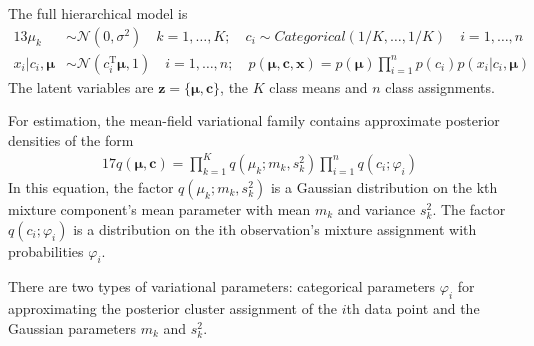 \documentclass[letterpaper]{article}
\newcommand{\bz}{\mathbf{z}}
\newcommand{\bx}{\mathbf{x}}
\newcommand{\bmu}{\boldsymbol{\mu}}
\newcommand{\calN}{\mathcal{N}}
\newcommand{\bT}{\mathrm{T}}
\newcommand{\bc}{\mathbf{c}}
\begin{document}
The full hierarchical model is
\begin{alignat}{13}
\mu_k &\sim \calN(0, \sigma^2) \quad k=1,\dots,K; \quad c_i \sim Categorical(1/K, \dots, 1/K) \quad i=1,\dots,n \\
x_i | c_i, \bmu &\sim \calN(c^{\bT}_i \bmu, 1) \quad i=1,\dots,n; \quad p(\bmu, \bc, \bx) = p(\bmu) \prod_{i=1}^n p(c_i)p(x_i | c_i, \bmu)
\end{alignat}
The latent variables are $\bz = \{ \bmu, \bc \}$, the $K$ class means and $n$ class assignments.

For estimation, the mean-field variational family contains approximate posterior densities of the form
\begin{alignat}{17}
q(\bmu, \bc) = \prod_{k=1}^K q(\mu_k;m_k, s_k^2) \prod_{i=1}^n q(c_i;\varphi_i) \label{eq:17}
\end{alignat}
In this equation, the factor $q(\mu_k;m_k, s_k^2)$ is a Gaussian distribution on the kth mixture component's mean parameter with mean $m_k$ and variance $s_k^2$. The factor $q(c_i;\varphi_i)$ is a distribution on the ith observation's mixture assignment with probabilities $\varphi_i$.

There are two types of variational parameters: categorical parameters $\varphi_i$ for approximating the posterior cluster assignment of the $i$th data point and the Gaussian parameters $m_k$ and $s_k^2$. 

\end{document}
